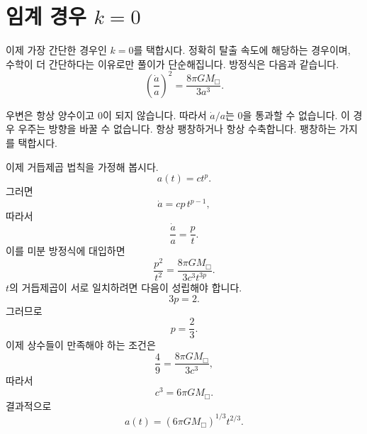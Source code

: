 \begin{classroomqa}
\end{classroomqa}

\section{임계 경우 \(k=0\)}

이제 가장 간단한 경우인 \(k=0\)를 택합시다. 정확히 탈출 속도에 해당하는 경우이며, 수학이 더 간단하다는 이유로만 풀이가 단순해집니다. 방정식은 다음과 같습니다.
\begin{equation}
\left(\frac{\dot a}{a}\right)^2=\frac{8\pi G M_{\Box}}{3a^3}.
\end{equation}

우변은 항상 양수이고 0이 되지 않습니다. 따라서 \(\dot a/a\)는 0을 통과할 수 없습니다. 이 경우 우주는 방향을 바꿀 수 없습니다. 항상 팽창하거나 항상 수축합니다. 팽창하는 가지를 택합시다.

이제 거듭제곱 법칙을 가정해 봅시다.
\begin{equation}
a(t)=ct^p.
\end{equation}
그러면
\begin{equation}
\dot a = cp\,t^{p-1},
\end{equation}
따라서
\begin{equation}
\frac{\dot a}{a}=\frac{p}{t}.
\end{equation}
이를 미분 방정식에 대입하면
\begin{equation}
\frac{p^2}{t^2}=\frac{8\pi G M_{\Box}}{3c^3t^{3p}}.
\end{equation}
\(t\)의 거듭제곱이 서로 일치하려면 다음이 성립해야 합니다.
\begin{equation}
3p=2.
\end{equation}
그러므로
\begin{equation}
p=\frac{2}{3}.
\end{equation}
이제 상수들이 만족해야 하는 조건은
\begin{equation}
\frac{4}{9}=\frac{8\pi G M_{\Box}}{3c^3},
\end{equation}
따라서
\begin{equation}
c^3=6\pi G M_{\Box}.
\end{equation}
결과적으로
\begin{equation}
a(t)=\left(6\pi G M_{\Box}\right)^{1/3}t^{2/3}.
\end{equation}

